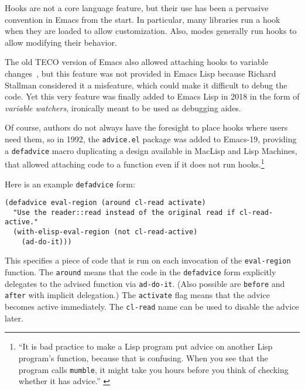 \documentclass[format=acmsmall, review]{acmart}
\newcommand \Elisp {Emacs Lisp}
\begin{document}
Hooks are not a core language feature, but their use has been a
pervasive convention in Emacs from the start.  In particular, many
libraries run a hook when they are loaded to allow customization.
Also, modes generally run hooks to allow modifying their behavior.

The old TECO version of Emacs also allowed attaching hooks to variable
changes~\cite{Stallman1981}, but this feature was not provided in \Elisp{}
because Richard Stallman considered it a misfeature, which could make it
difficult to debug the code.  Yet this very feature was finally added to
\Elisp{} in 2018 in the form of \emph{variable watchers},
ironically meant to be used as debugging aides.

Of course, authors do not always have the foresight to place hooks where
users need them, so in 1992, the \texttt{advice.el} package was added to
Emacs-19, providing a \texttt{defadvice} macro duplicating a design
available in MacLisp and Lisp Machines, that allowed attaching code to
a function even if it does not run hooks.\footnote{``It is bad practice
  to make a Lisp program put advice on another Lisp
  program's function, because that is confusing.  When you see that the
  program calls \texttt{mumble}, it might take you hours before you think of
  checking whether it has advice.'' \cite{Stallman2018-personal}}

Here is an example \texttt{defadvice} form:
%
\begin{verbatim}
(defadvice eval-region (around cl-read activate)
  "Use the reader::read instead of the original read if cl-read-active."
  (with-elisp-eval-region (not cl-read-active)
    (ad-do-it)))
\end{verbatim}
%
This specifies a piece of code that is run on each invocation of the
\texttt{eval-region} function.  The \texttt{around} means that the
code in the \texttt{defadvice} form explicitly delegates to the
advised function via \texttt{ad-do-it}.  (Also possible are
\texttt{before} and \texttt{after} with implicit delegation.)  The
\texttt{activate} flag means that the advice becomes active
immediately.  The \texttt{cl-read} name can be used to disable the
advice later.
\end{document}
